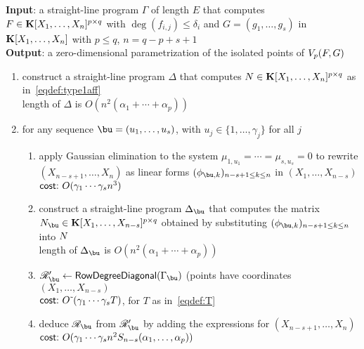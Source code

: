 \documentclass[12pt]{article}
\begin{document}

















\begin{algorithm}[!h]
\caption{$\mathsf{RowDegree}(\Gamma)$}
{\bf Input}:  a straight-line program $\Gamma$ of length $E$ that computes
 $F \in \mathbf{K}[X_1, \ldots, X_n]^{p \times q}$ with $\deg(f_{i,j}) \leq \delta_i$
and $G = (g_1, \ldots, g_s)$ in $\mathbf{K}[X_1, \ldots, X_n]$ with $p \leq q$, $n = q-p+s+1$\\
{\bf Output}: a zero-dimensional parametrization of the isolated points of $V_{p}({F},G)$
\begin{enumerate}
\item construct a straight-line program $\Delta$ that computes ${N} \in \mathbf{K}[X_1,\dots,X_n]^{p \times q}$ as in~\eqref{eqdef:type1aff}\\
length of $\Delta$ is $O(n^2(\alpha_1+\cdots+\alpha_p))$
\item for any sequence $\bu=(u_1,\dots,u_s)$, with $u_j \in \{1,\dots,\gamma_j\}$ for all $j$
\begin{enumerate}
\item apply Gaussian elimination to the system $\mu_{1,u_1}=\cdots=\mu_{s,u_s}=0$
  to rewrite $(X_{n-s+1}, \ldots, X_n)$ as linear forms $(\phi_{\bu,k})_{n-s+1 \le k \le n}$ in $(X_1,\dots,X_{n-s})$\\
  $\text{\sf{cost:~}} O(\gamma_1 \cdots \gamma_s n^3)$

\item construct a straight-line program $\Delta_{\bu}$ that computes the matrix 
  $\mN_\bu  \in \KK[X_1, \dots, X_{n-s}]^{p \times q}$ obtained
  by substituting $(\phi_{\bu,k})_{n-s+1 \le k \le n}$ into ${N}$ \\
  length of $\Delta_{\bu}$ is $O(n^2(\alpha_1+\cdots+\alpha_p))$

\item $\scrR'_\bu \gets \mathsf{RowDegreeDiagonal}(\Gamma_\bu)$ (points have coordinates $(X_1,\dots,X_{n-s})$\\
  $\text{\sf{cost:~}} {O}{\,\tilde{ }\,}(\gamma_1 \cdots \gamma_s T)$, for $T$ as in~\eqref{eqdef:T}

\item deduce $\scrR_\bu$ from $\scrR'_\bu$ by adding the expressions for $(X_{n-s+1},\dots,X_n)$ 
  $\text{\sf{cost:~}} O(\gamma_1 \cdots \gamma_s n^2 S_{n-s}(\alpha_1,\dots,\alpha_p))$



\end{enumerate}
\end{enumerate}
\end{algorithm}
\end{document}
